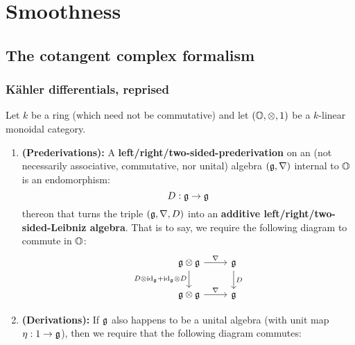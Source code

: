     \section{Smoothness}
        \subsection{The cotangent complex formalism}
            \subsubsection{K\"ahler differentials, reprised}
                \begin{definition} \label{def: derivations}
                    Let $k$ be a ring (which need not be commutative) and let $(\O, \tensor, 1)$ be a $k$-linear monoidal category. 
                        \begin{enumerate}
                            \item \textbf{(Prederivations):} A \textbf{left/right/two-sided-prederivation} on an (not necessarily associative, commutative, nor unital) algebra $\left(\g, \nabla\right)$ internal to $\O$ is an endomorphism:
                                $$D: \g \to \g$$
                            thereon that turns the triple $\left(\g, \nabla, D\right)$ into an \textbf{additive left/right/two-sided-Leibniz algebra}. That is to say, we require the following diagram to commute in $\O$:
                                $$
                                    \begin{tikzcd}
                                    	{\g \tensor \g} & {\g} \\
                                    	{\g \tensor \g} & {\g}
                                    	\arrow["{D}", from=1-2, to=2-2]
                                    	\arrow["{\nabla}", from=2-1, to=2-2]
                                    	\arrow["{\nabla}", from=1-1, to=1-2]
                                    	\arrow["{D \tensor \id_{\g} + \id_{\g} \tensor D}"', from=1-1, to=2-1]
                                    \end{tikzcd}
                                $$
                            \item \textbf{(Derivations):} If $\g$ also happens to be a unital algebra (with unit map $\eta: 1 \to \g$), then we require that the following diagram commutes:
                                $$
                                    \begin{tikzcd}

\end{tikzcd}$$
\end{enumerate}
\end{definition}
